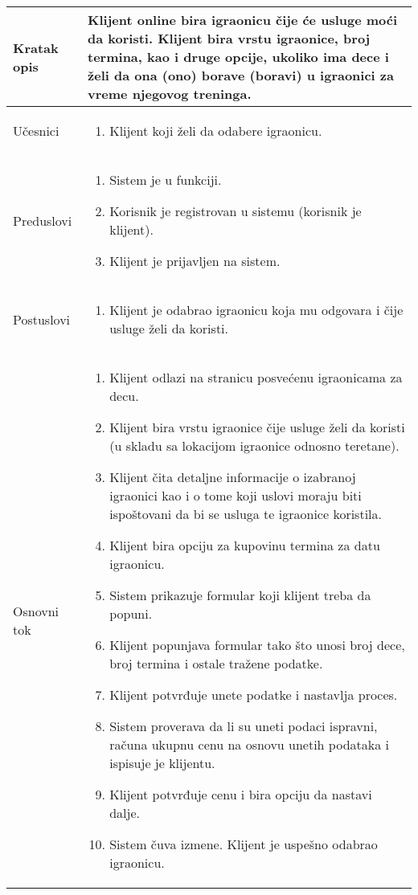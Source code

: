 \documentclass[../../main.tex]{subfiles}
\begin{document}
\begin{longtable}{| p{} | p{} |} 
\hline
    Kratak opis & Klijent online bira igraonicu čije će usluge moći da koristi. Klijent bira vrstu igraonice, broj termina, kao i druge opcije, ukoliko ima dece i želi da ona (ono) borave (boravi) u igraonici za vreme njegovog treninga. \\ 
\hline    
    Učesnici &
    \begin{enumerate}
        \item Klijent koji želi da odabere igraonicu.
    \end{enumerate}\\
\hline
   Preduslovi &
   \begin{enumerate}
        \item Sistem je u funkciji.
        \item Korisnik je registrovan u sistemu (korisnik je klijent).
        \item Klijent je prijavljen na sistem.
    \end{enumerate}\\
\hline  
    Postuslovi & 
    \begin{enumerate}
        \item Klijent je odabrao igraonicu koja mu odgovara i čije usluge želi da koristi.
    \end{enumerate} \\
\hline
    Osnovni tok & 
    \begin{enumerate}
        \item Klijent odlazi na stranicu posvećenu igraonicama za decu.
        \item Klijent bira vrstu igraonice čije usluge želi da koristi (u skladu sa lokacijom igraonice odnosno teretane).
        \item Klijent čita detaljne informacije o izabranoj igraonici kao i o tome koji uslovi moraju biti ispoštovani da bi se usluga te igraonice koristila.
        \item Klijent bira opciju za kupovinu termina za datu igraonicu.
        \item Sistem prikazuje formular koji klijent treba da popuni.
        \item Klijent popunjava formular tako što unosi broj dece, broj termina i ostale tražene podatke.
        \item Klijent potvrđuje unete podatke i nastavlja proces.
        \item Sistem proverava da li su uneti podaci ispravni, računa ukupnu cenu na osnovu unetih podataka i ispisuje je klijentu.
        \item Klijent potvrđuje cenu i bira opciju da nastavi dalje. 
        \item Sistem čuva izmene. Klijent je uspešno odabrao igraonicu. %
        

\end{enumerate}
\end{longtable}
\end{document}
